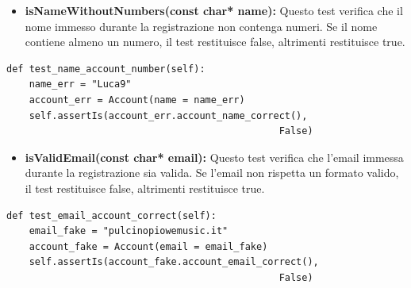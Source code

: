 \begin{itemize}    
    \item \textbf{isNameWithoutNumbers(const char* name):}
    Questo test verifica che il nome immesso durante la registrazione non contenga numeri. Se il nome contiene almeno un numero, il test restituisce false, altrimenti restituisce true.
\end{itemize}
\begin{lstlisting}[caption={class AccountModelTests(TestCase)}, captionpos=b]
def test_name_account_number(self):
    name_err = "Luca9"
    account_err = Account(name = name_err)
    self.assertIs(account_err.account_name_correct(), 
                                                False)
\end{lstlisting} 
\vspace{0.2cm}

\begin{itemize}
    \item \textbf{isValidEmail(const char* email):}
    Questo test verifica che l'email immessa durante la registrazione sia valida. Se l'email non rispetta un formato valido, il test restituisce false, altrimenti restituisce true.
\end{itemize}
\begin{lstlisting}[caption={class AccountModelTests(TestCase)}, captionpos=b]
def test_email_account_correct(self):
    email_fake = "pulcinopiowemusic.it"
    account_fake = Account(email = email_fake)
    self.assertIs(account_fake.account_email_correct(), 
                                                False)
\end{lstlisting}

